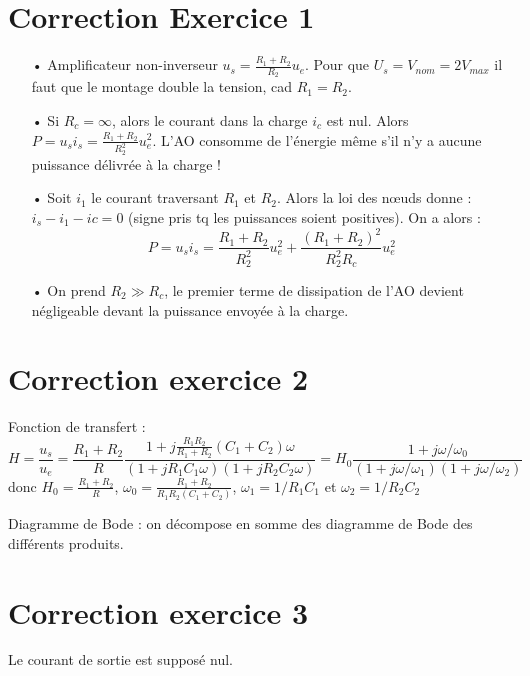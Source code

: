 \documentclass{report}
\begin{document}
\section*{Correction Exercice 1}

\begin{itemize}
	\item[•] Amplificateur non-inverseur $u_s = \frac{R_1+R_2}{R_2}u_e$. Pour que $U_s = V_{nom}=2V_{max}$ il faut que le montage double la tension, cad $R_1=R_2$.
	\item[•]  Si $R_c=\infty$, alors le courant dans la charge $i_c$ est nul. Alors $P=u_si_s= \frac{R_1+R_2}{R_2^2}u_e^2$. L'AO consomme de l'énergie même s'il n'y a aucune puissance délivrée à la charge !
	\item[•] Soit $i_1$ le courant traversant $R_1$ et $R_2$. Alors la loi des nœuds donne : $i_s-i_1-ic=0$ (signe pris tq les puissances soient positives). On a alors :
	\begin{equation}
		P=u_si_s=\frac{R_1+R_2}{R_2^2}u_e^2+\frac{(R_1+R_2)^2}{R_2^2R_c}u_e^2
	\end{equation}
	\item[•] On prend $R_2\gg R_c$, le premier terme de dissipation de l'AO devient négligeable devant la puissance envoyée à la charge.
\end{itemize}

\section*{Correction exercice 2}
Fonction de transfert :
\begin{equation}
	H=\frac{u_s}{u_e}=\frac{R_1+R_2}{R}\frac{1+j\frac{R_1R_2}{R_1+R_2}(C_1+C_2)\omega}{(1+jR_1C_1\omega)(1+jR_2C_2\omega)}=H_0\frac{1+j\omega/\omega_0}{(1+j\omega/\omega_1)(1+j\omega/\omega_2)}
\end{equation}
donc $H_0=\frac{R_1+R_2}{R}$, $\omega_0=\frac{R_1+R_2}{R_1R_2(C_1+C_2)}$, $\omega_1=1/R_1C_1$ et $\omega_2=1/R_2C_2$

Diagramme de Bode : on décompose en somme des diagramme de Bode des différents produits.

\section*{Correction exercice 3}

Le courant de sortie est supposé nul.
\end{document}

